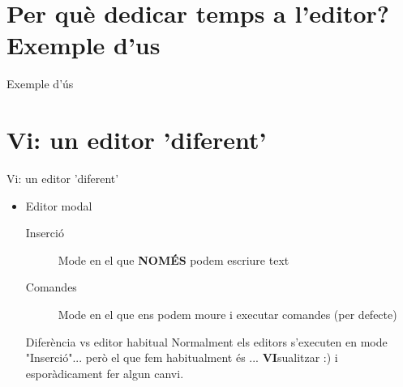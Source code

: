 \documentclass{beamer}
\begin{document}


\section{Per què dedicar temps a l'editor? Exemple d'us}
\begin{frame}{Exemple d'ús}
\end{frame}
\section{Vi: un editor 'diferent'}
    \begin{frame}{Vi: un editor 'diferent'}
        \begin{itemize}
            \item Editor modal
                \begin{description}
                    \item [Inserció] Mode en el que \textbf{NOMÉS} podem escriure text
                    \item [Comandes] Mode en el que ens podem moure i executar
                        comandes (per defecte)
                \end{description}
                \begin{alertblock}{Diferència vs editor habitual}
                    Normalment els editors s'executen en mode
                    "Inserció"... però el que fem habitualment és ...
                    \textbf{VI}sualitzar  :) i esporàdicament fer algun canvi.
                \end{alertblock}
        \end{itemize}
    \end{frame}
\end{document}
